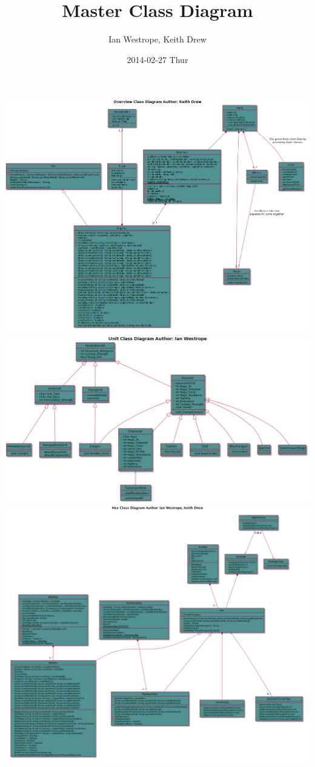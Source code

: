 \documentclass[11pt]{article}
\title{Master Class Diagram}
\author{Ian Westrope, Keith Drew}
\date{2014-02-27 Thur}
\begin{document}
\maketitle


\includegraphics[width=\linewidth]{overview.png}
\includegraphics[width=\linewidth]{units.png}
\includegraphics[width=\linewidth]{hex.png}
\end{document}
